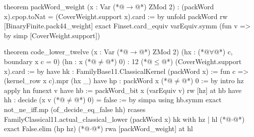 theorem packWord_weight (x : Var (*@$\to$@*) ZMod 2) : (packWord x).cpop.toNat = (CoverWeight.support x).card := by
  unfold packWord
  rw [BinaryFinite.pack44_weight]
  exact Finset.card_equiv varEquiv.symm (fun v => by simp [CoverWeight.support])

theorem code_lower_twelve (x : Var (*@$\to$@*) ZMod 2) (hx : (*@$\forall$@*) c, boundary x c = 0) (hn : x (*@$\ne$@*) 0) :
    12 (*@$\le$@*) (CoverWeight.support x).card := by
  have hk : FamilyBase11.ClassicalKernel (packWord x) := fun c => (kernel_row x c).mpr (hx _)
  have hp : packWord x (*@$\ne$@*) 0 := by
    intro hz
    apply hn
    funext v
    have hb := packWord_bit x (varEquiv v)
    rw [hz] at hb
    have hh : decide (x v (*@$\ne$@*) 0) = false := by simpa using hb.symm
    exact not_ne_iff.mp (of_decide_eq_false hh)
  rcases FamilyClassical11.actual_classical_lower (packWord x) hk with hz | hl
  (*@$\cdot$@*) exact False.elim (hp hz)
  (*@$\cdot$@*) rwa [packWord_weight] at hl
